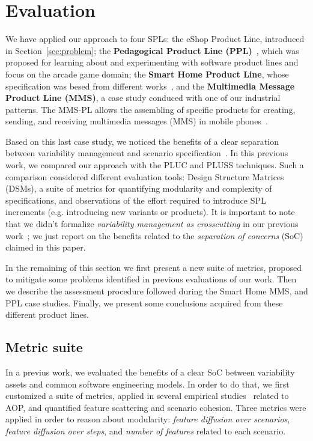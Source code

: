 \section{Evaluation}
\label{sec:evaluation}

We have applied our approach to four SPLs: the eShop Product Line, introduced in
Section~\ref{sec:problem}; the {\bf Pedagogical Product Line
(PPL)}~\cite{ppl-url}, which was proposed for learning about and experimenting
with software product lines and focus on the arcade game domain; the {\bf Smart
Home Product Line}, whose specification was besed from different
works~\cite{Pohl:2005aa}, and the {\bf Multimedia Message Product Line (MMS)},
a case study conduced with one of our industrial patterns. The MMS-PL allows the
assembling of specific products for creating, sending, and receiving multimedia
messages (MMS) in mobile phones~\cite{Bonifacio:2008aa}.

Based on this last case study, we noticed the benefits of a clear separation
between variability management and scenario
specification~\cite{Bonifacio:2008aa}. In this previous work, we compared our
approach with the PLUC and PLUSS techniques. Such a comparison considered
different evaluation tools: Design Structure Matrices (DSMs), a suite of metrics
for quantifying modularity and complexity of specifications, and observations of
the effort required to introduce SPL increments (e.g. introducing new variants or
products). It is important to note that we didn't formalize \emph{variability
management as crosscutting} in our previous work~\cite{Bonifacio:2008aa}; we just
report on the benefits related to the \emph{separation of concerns} (SoC) claimed
in this paper.

In the remaining of this section we first present a new suite of metrics,
proposed to mitigate some problems identified in previous evaluations of our
work. Then we describe the assessment procedure followed during the Smart Home
MMS, and PPL case studies. Finally, we present some conclusions acquired from
these different product lines.

\subsection{Metric suite}\label{sub:metric-suite}

In a previus work, we evaluated the benefits of a clear SoC between variability
assets and common software engineering models. In order to do that, we first
customized a suite of metrics, applied in several empirical
studies~\cite{Garcia:2005aa,Greenwood:2007aa,Figueiredo:2008ab,Figueiredo:2008ab}
related to AOP, and quantified feature scattering and scenario cohesion. Three
metrics were applied in order to reason about modularity: \emph{feature diffusion
over scenarios}, \emph{feature diffusion over steps}, and \emph{number of
features} related to each scenario.

